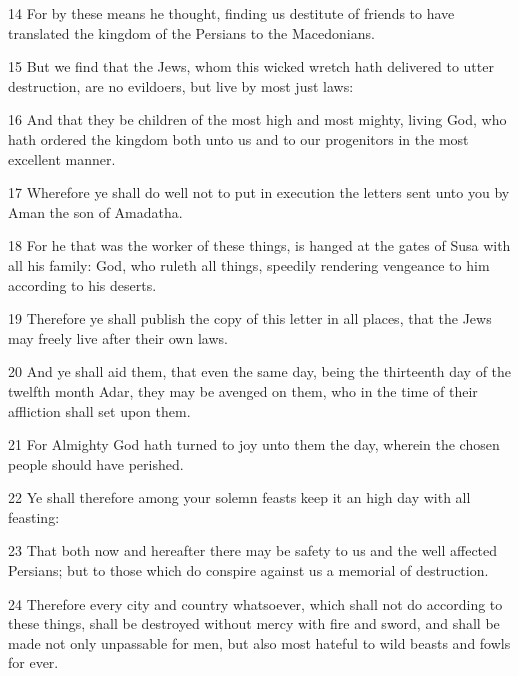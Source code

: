 \par 14 For by these means he thought, finding us destitute of friends to have translated the kingdom of the Persians to the Macedonians.
\par 15 But we find that the Jews, whom this wicked wretch hath delivered to utter destruction, are no evildoers, but live by most just laws:
\par 16 And that they be children of the most high and most mighty, living God, who hath ordered the kingdom both unto us and to our progenitors in the most excellent manner.
\par 17 Wherefore ye shall do well not to put in execution the letters sent unto you by Aman the son of Amadatha.
\par 18 For he that was the worker of these things, is hanged at the gates of Susa with all his family: God, who ruleth all things, speedily rendering vengeance to him according to his deserts.
\par 19 Therefore ye shall publish the copy of this letter in all places, that the Jews may freely live after their own laws.
\par 20 And ye shall aid them, that even the same day, being the thirteenth day of the twelfth month Adar, they may be avenged on them, who in the time of their affliction shall set upon them.
\par 21 For Almighty God hath turned to joy unto them the day, wherein the chosen people should have perished.
\par 22 Ye shall therefore among your solemn feasts keep it an high day with all feasting:
\par 23 That both now and hereafter there may be safety to us and the well affected Persians; but to those which do conspire against us a memorial of destruction.
\par 24 Therefore every city and country whatsoever, which shall not do according to these things, shall be destroyed without mercy with fire and sword, and shall be made not only unpassable for men, but also most hateful to wild beasts and fowls for ever.

